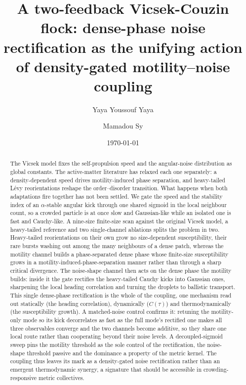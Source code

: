 \documentclass[aps,preprint,amsmath,amssymb,nofootinbib,superscriptaddress]{revtex4-2}
\begin{document}
\title{A two-feedback Vicsek-Couzin flock: dense-phase noise rectification as the unifying action of density-gated motility--noise coupling}

\author{Yaya Youssouf Yaya}

\author{Mamadou Sy}

\date{\today}

\begin{abstract}
The Vicsek model fixes the self-propulsion speed and the
angular-noise distribution as global constants. The
active-matter literature has relaxed each one separately: a
density-dependent speed drives motility-induced phase
separation, and heavy-tailed L\'evy reorientations reshape the
order--disorder transition. What happens when both adaptations
fire together has not been settled. We gate the speed and the
stability index of an $\alpha$-stable angular kick through one
shared sigmoid in the local neighbour count, so a crowded
particle is at once slow and Gaussian-like while an isolated
one is fast and Cauchy-like. A nine-size finite-size scan
against the original Vicsek model, a heavy-tailed reference and
two single-channel ablations splits the problem in two. Heavy-tailed
reorientations on their own grow no size-dependent
susceptibility, their rare bursts washing out among the many
neighbours of a dense patch, whereas the motility channel
builds a phase-separated dense phase whose finite-size
susceptibility grows in a motility-induced-phase-separation
manner rather than through a sharp critical divergence. The
noise-shape channel then acts on the dense phase the motility
builds: inside it the gate rectifies the heavy-tailed Cauchy
kicks into Gaussian ones, sharpening the local heading
correlation and turning the droplets to ballistic transport.
This single dense-phase rectification is the whole of the
coupling, one mechanism read out statically (the heading
correlation), dynamically ($C(\tau)$) and thermodynamically (the
susceptibility growth). A matched-noise control confirms it:
retuning the motility-only mode so its kick decorrelates as fast
as the full mode's rectified one makes all three observables
converge and the two channels become additive, so they share one
local route rather than cooperating beyond their noise levels. A
decoupled-sigmoid sweep pins the motility threshold as the sole
control of the rectification, the noise-shape threshold passive
and the dominance a property of the metric kernel. The coupling
thus leaves its mark as a density-gated noise rectification
rather than an emergent thermodynamic synergy, a signature that
should be accessible in crowding-responsive metric collectives.
\end{abstract}
\end{document}
